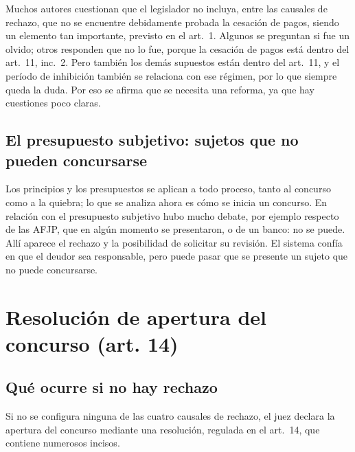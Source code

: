 \documentclass[12pt,oneside]{book}
\begin{document}
Muchos autores cuestionan que el legislador no incluya, entre las causales de rechazo, que no se encuentre debidamente probada la cesación de pagos, siendo un elemento tan importante, previsto en el art.~1. Algunos se preguntan si fue un olvido; otros responden que no lo fue, porque la cesación de pagos está dentro del art.~11, inc.~2. Pero también los demás supuestos están dentro del art.~11, y el período de inhibición también se relaciona con ese régimen, por lo que siempre queda la duda. Por eso se afirma que se necesita una reforma, ya que hay cuestiones poco claras.


\subsection{El presupuesto subjetivo: sujetos que no pueden concursarse}

Los principios y los presupuestos se aplican a todo proceso, tanto al concurso como a la quiebra; lo que se analiza ahora es cómo se inicia un concurso. En relación con el presupuesto subjetivo hubo mucho debate, por ejemplo respecto de las AFJP, que en algún momento se presentaron, o de un banco: no se puede. Allí aparece el rechazo y la posibilidad de solicitar su revisión. El sistema confía en que el deudor sea responsable, pero puede pasar que se presente un sujeto que no puede concursarse.

\section{Resolución de apertura del concurso (art. 14)}

\subsection{Qué ocurre si no hay rechazo}

Si no se configura ninguna de las cuatro causales de rechazo, el juez declara la apertura del concurso mediante una resolución, regulada en el art.~14, que contiene numerosos incisos.
\end{document}
